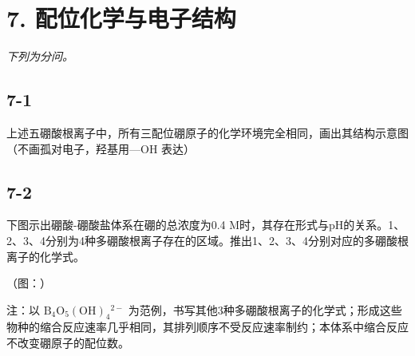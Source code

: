 \section*{7. 配位化学与电子结构}
\textit{下列为分问。}

\subsection*{7-1}
上述五硼酸根离⼦中，所有三配位硼原⼦的化学环境完全相同，画出其结构⽰意图（不画孤对电⼦，羟基⽤—OH 表达）

\subsection*{7-2}
下图⽰出硼酸-硼酸盐体系在硼的总浓度为0.4 M时，其存在形式与pH的关系。1、2、3、4分别为4种多硼酸根离⼦存在的区域。推出1、2、3、4分别对应的多硼酸根离⼦的化学式。

（图：）

注：以 $\mathrm { B } _ { 4 } \mathrm { O } _ { 5 } ( \mathrm { O H } ) _ { 4 } { } ^ { 2 - }$ 为范例，书写其他3种多硼酸根离⼦的化学式；形成这些物种的缩合反应速率⼏乎相同，其排列顺序不受反应速率制约；本体系中缩合反应不改变硼原⼦的配位数。
